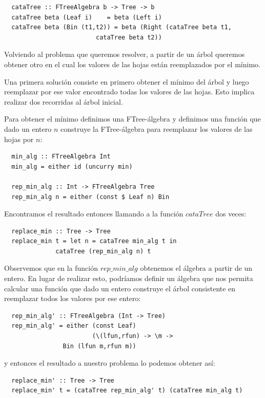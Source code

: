\documentclass[a4paper,10pt]{article}
\begin{document}
\begin{lstlisting}
  cataTree :: FTreeAlgebra b -> Tree -> b
  cataTree beta (Leaf i)    = beta (Left i)
  cataTree beta (Bin (t1,t2)) = beta (Right (cataTree beta t1,
					     cataTree beta t2))
\end{lstlisting}


Volviendo al problema que queremos resolver, a partir de un árbol queremos obtener
otro en el cual los valores de las hojas están reemplazados por el mínimo.

Una primera solución consiste en primero obtener el mínimo del árbol y luego reemplazar
por ese valor encontrado todas los valores de las hojas. Esto implica realizar dos 
recorridas al árbol inicial.

Para obtener el mínimo definimos una FTree-álgebra y definimos una función
que dado un entero $n$ construye la FTree-álgebra para reemplazar
los valores de las hojas por $n$:

\begin{lstlisting}
  min_alg :: FTreeAlgebra Int
  min_alg = either id (uncurry min)

  rep_min_alg :: Int -> FTreeAlgebra Tree
  rep_min_alg n = either (const $ Leaf n) Bin
\end{lstlisting}

Encontramos el resultado entonces llamando a la función $cataTree$
dos veces:

\begin{lstlisting}
  replace_min :: Tree -> Tree
  replace_min t = let n = cataTree min_alg t in
		      cataTree (rep_min_alg n) t
\end{lstlisting}

Observemos que en la función $rep\_min\_alg$ obtenemos el álgebra a partir de un entero.
En lugar de realizar esto, podríamos definir un álgebra que nos permita calcular una función
que dado un entero construye el árbol consistente en reemplazar todos los valores
por ese entero:

\begin{lstlisting}
  rep_min_alg' :: FTreeAlgebra (Int -> Tree)
  rep_min_alg' = either (const Leaf) 
                        (\(lfun,rfun) -> \m -> 
			    Bin (lfun m,rfun m))
\end{lstlisting}

\noindent y entonces el resultado a nuestro problema lo podemos obtener así:

\begin{lstlisting}
  replace_min' :: Tree -> Tree
  replace_min' t = (cataTree rep_min_alg' t) (cataTree min_alg t) 
\end{lstlisting}
\end{document}
